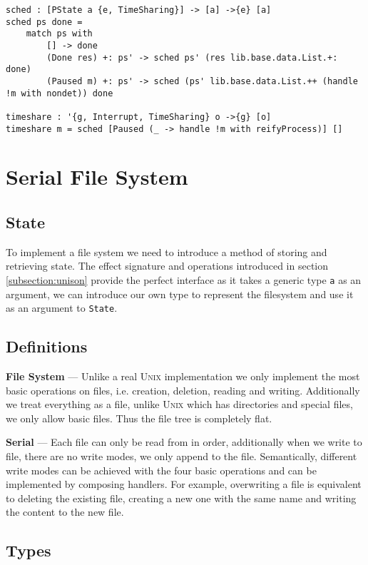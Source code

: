 \documentclass[logo,bsc,singlespacing,parskip]{infthesis}
\begin{document}
\begin{lstlisting}[language=unison]
sched : [PState a {e, TimeSharing}] -> [a] ->{e} [a]
sched ps done = 
    match ps with
        [] -> done
        (Done res) +: ps' -> sched ps' (res lib.base.data.List.+: done)
        (Paused m) +: ps' -> sched (ps' lib.base.data.List.++ (handle !m with nondet)) done

timeshare : '{g, Interrupt, TimeSharing} o ->{g} [o]
timeshare m = sched [Paused (_ -> handle !m with reifyProcess)] []
\end{lstlisting}

\section{Serial File System}

\subsection{State}

To implement a file system we need to introduce a method of storing and
retrieving state. The effect signature and operations introduced in section
\ref{subsection:unison} provide the perfect interface as it takes a generic
type \texttt{a} as an argument, we can introduce our own type to represent the
filesystem and use it as an argument to \texttt{State}.

\subsection{Definitions}

\textbf{File System} ---
Unlike a real \textsc{Unix} implementation we only implement the most basic
operations on files, i.e. creation, deletion, reading and writing. Additionally
we treat everything as a file, unlike \textsc{Unix} which has directories and
special files, we only allow basic files. Thus the file tree is completely flat.

\textbf{Serial} --- Each file can only be read from in order, additionally when
we write to file, there are no write modes, we only append to the file.
Semantically, different write modes can be achieved with the four basic
operations and can be implemented by composing handlers. For example,
overwriting a file is equivalent to deleting the existing file, creating a new
one with the same name and writing the content to the new file.

\subsection{Types}
\label{sec:filesystemtypes}
\end{document}

